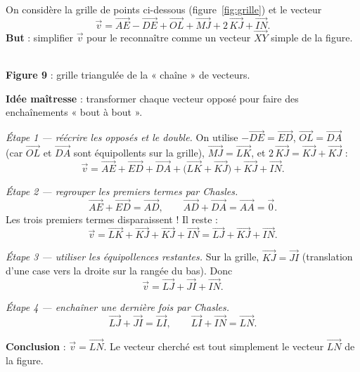 \documentclass[11pt,a4paper]{article}
\newcommand{\vc}[1]{\overrightarrow{#1}}        %
\begin{document}
\begin{exemple}
On considère la grille de points ci-dessous (figure~\ref{fig:grille}) et le vecteur
\[
  \vec{v}=\vc{AE}-\vc{DE}+\vc{OL}+\vc{MJ}+2\,\vc{KJ}+\vc{IN}.
\]
\textbf{But} : simplifier $\vec{v}$ pour le reconnaître comme un vecteur $\vc{XY}$ simple de la figure.

\begin{center}
\\[2pt]
{\small\textbf{\textcolor{primary}{Figure 9}} : grille triangulée de la « chaîne » de vecteurs.}
\label{fig:grille}
\end{center}

\textbf{Idée maîtresse} : transformer chaque vecteur opposé pour faire des enchaînements « bout à bout ».

\smallskip
\emph{Étape 1 — réécrire les opposés et le double.} On utilise $-\vc{DE}=\vc{ED}$, $\vc{OL}=\vc{DA}$
(car $\vc{OL}$ et $\vc{DA}$ sont équipollents sur la grille), $\vc{MJ}=\vc{LK}$, et $2\,\vc{KJ}=\vc{KJ}+\vc{KJ}$ :
\[
  \vec{v}=\vc{AE}+\vc{ED}+\vc{DA}+\bigl(\vc{LK}+\vc{KJ}\bigr)+\vc{KJ}+\vc{IN}.
\]

\emph{Étape 2 — regrouper les premiers termes par Chasles.}
\[
  \vc{AE}+\vc{ED}=\vc{AD},\qquad \vc{AD}+\vc{DA}=\vc{AA}=\vec{0}.
\]
Les trois premiers termes disparaissent ! Il reste :
\[
  \vec{v}=\vc{LK}+\vc{KJ}+\vc{KJ}+\vc{IN}=\vc{LJ}+\vc{KJ}+\vc{IN}.
\]

\emph{Étape 3 — utiliser les équipollences restantes.} Sur la grille, $\vc{KJ}=\vc{JI}$ (translation
d'une case vers la droite sur la rangée du bas). Donc
\[
  \vec{v}=\vc{LJ}+\vc{JI}+\vc{IN}.
\]

\emph{Étape 4 — enchaîner une dernière fois par Chasles.}
\[
  \vc{LJ}+\vc{JI}=\vc{LI},\qquad \vc{LI}+\vc{IN}=\vc{LN}.
\]

\textbf{Conclusion} : $\boxed{\vec{v}=\vc{LN}}$. Le vecteur cherché est tout simplement le vecteur $\vc{LN}$
de la figure.
\end{exemple}
\end{document}
